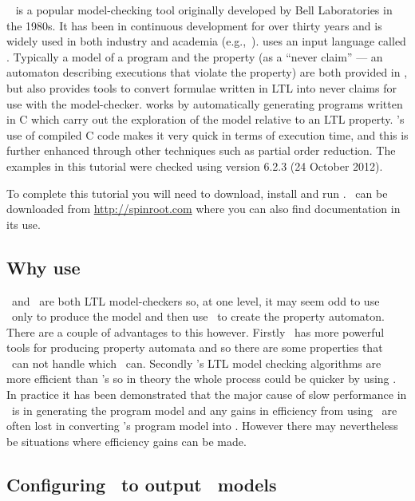 \documentclass[a4]{article}
\begin{document}
\spin{}~\cite{holzmann04spin} is a popular model-checking tool
originally developed by Bell Laboratories in the 1980s.  It has been
in continuous development for over thirty years and is widely used in
both industry and academia
(e.g.,~\cite{havelund00formal,kars96application,kirsch11technical}).
\spin{} uses an input language called \promela{}.  Typically a model
of a program and the property (as a ``never claim'' --- an automaton
describing executions that violate the property) are both provided in
\promela{}, but \spin{} also provides tools to convert formulae
written in LTL into never claims for use with the
model-checker. \spin{} works by automatically generating programs
written in C which carry out the exploration of the model relative to
an LTL property. \spin{}'s use of compiled C code makes it very quick
in terms of execution time, and this is further enhanced through other
techniques such as partial order reduction. The examples in this tutorial were checked using \spin{} version 6.2.3 (24 October 2012).

To complete this tutorial you will need to download, install and run \spin.  \spin\ can be downloaded from \url{http://spinroot.com} where you can also find documentation in its use.

\subsection{Why use \spin{}}

\spin\ and \ajpf\ are both LTL model-checkers so, at one level, it may seem odd to use \ajpf\ only to produce the model and then use \spin\ to create the property automaton.  There are a couple of advantages to this however.  Firstly \spin\ has more powerful tools for producing property automata and so there are some properties that \ajpf\ can not handle which \spin\ can.  Secondly \spin's LTL model checking algorithms are more efficient than \ajpf's so in theory the whole process could be quicker by using \spin.  In practice it has been demonstrated that the major cause of slow performance in \ajpf\ is in generating the program model and any gains in efficiency from using \spin\ are often lost in converting \ajpf's program model into \promela{}.  However there may  nevertheless be situations where efficiency gains can be made.

\subsection{Configuring \ajpf\ to output \spin\ models}
\label{sec:configure_spin}
\end{document}
